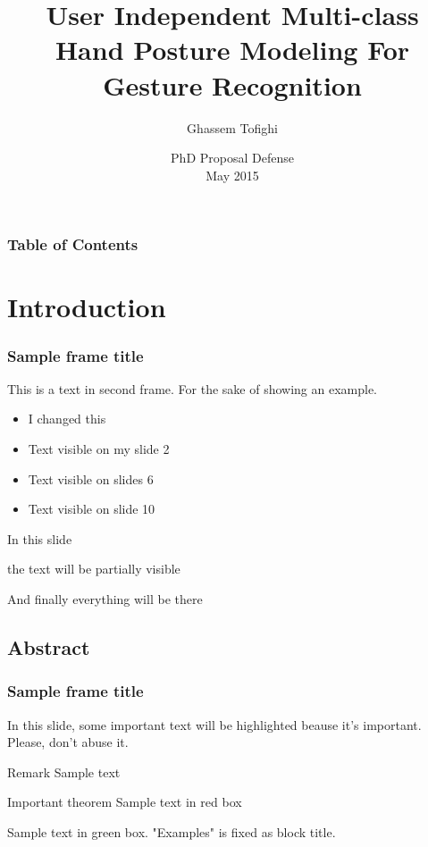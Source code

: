 \documentclass{beamer}
\title[\insertframenumber/\inserttotalframenumber] %
{User Independent Multi-class Hand Posture Modeling For Gesture Recognition}
\author[PhD Proposal] %
{Ghassem Tofighi}
\institute[VFU] %
{
Department of Electrical and Computer Engineering\\
Ryerosn University

}
\date[2015] %
{PhD Proposal Defense \\
	May 2015}
\begin{document}
\frame{\titlepage}


\begin{frame}
\frametitle{Table of Contents}
\tableofcontents
\end{frame}

\section{Introduction}

\begin{frame}
\frametitle{Sample frame title}
This is a text in second frame. For the sake of showing an example.

\begin{itemize}
    \item<1-> I changed this
    \item<2-> Text visible on my slide 2
    \item<3> Text visible on slides 6
    \item<4-> Text visible on slide 10
\end{itemize}
\end{frame}



\begin{frame}
In this slide \pause

the text will be partially visible \pause %

And finally everything will be there
\end{frame}

\subsection{Abstract}

\begin{frame}
\frametitle{Sample frame title}

In this slide, some important text will be
\alert{highlighted} beause it's important.
Please, don't abuse it.

\begin{block}{Remark}
Sample text
\end{block}

\begin{alertblock}{Important theorem}
Sample text in red box
\end{alertblock}

\begin{examples}
Sample text in green box. "Examples" is fixed as block title.
\end{examples}
\end{frame}
\end{document}
